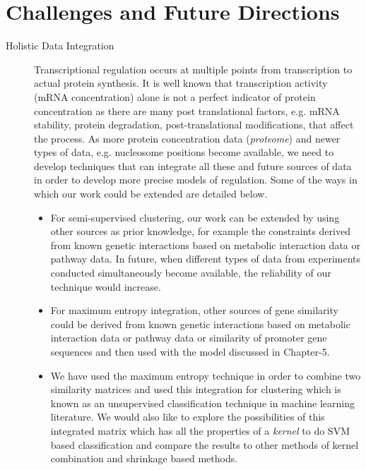\section{Challenges and Future Directions}
\begin{description}
\item[Holistic Data Integration] Transcriptional regulation occurs at multiple points from transcription to actual protein synthesis. It is well known that transcription activity (\ac{mRNA} concentration) alone is not a perfect indicator of protein concentration \citep{Griffin02Complementary} as there are many post translational factors, e.g. \ac{mRNA} stability, protein degradation, post-translational modifications, that affect the process. As more protein concentration data (\textit{proteome}) and newer types of data, e.g. nucleosome positions \citep{segal2007genomiccode,field2008distinct,kaplan2008nucleosome} become available, we need to develop techniques that can integrate all these and future sources of data in order to develop more precise models of regulation. Some of the ways in which our work could be extended are detailed below.
\begin{itemize}
    \item For semi-supervised clustering, our work can be extended by using other sources as prior knowledge, for example the constraints derived from known genetic interactions based on metabolic interaction data or pathway data. In future, when different types of data from experiments conducted simultaneously become available, the reliability of our technique would increase.

    \item For maximum entropy integration, other sources of gene similarity could be derived from known genetic interactions based on metabolic interaction data or pathway data or similarity of promoter gene sequences \citep{jean2006kernels} and then used with the model discussed in Chapter-5.

    \item We have used the maximum entropy technique in order to combine two similarity matrices and used this integration for clustering which is known as an unsupervised classification technique in machine learning literature. We would also like to explore the possibilities of this integrated matrix which has all the properties of a \textit{kernel} to do SVM based classification and compare the results to other methods of kernel combination \citep{lanck04kerneldatafusion} and shrinkage based methods.


\end{itemize}
\end{description}
